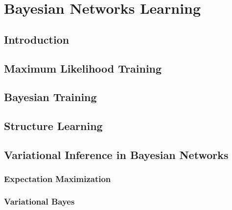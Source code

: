\documentclass[twoside,openright,titlepage,numbers=noenddot,openany,headinclude,footinclude=true, cleardoublepage=empty,abstractoff,BCOR=5mm,paper=a4,fontsize=11pt, dvipsnames]{scrreprt}
\begin{document}



\ctparttext{
  \color{black}
  \begin{center}

  \end{center}
}
\part{Bayesian Networks Learning}

\chapter{Introduction}



\chapter{Maximum Likelihood Training}



\chapter{Bayesian Training}



\chapter{Structure Learning}



\chapter{Variational Inference in Bayesian Networks}



\section{Expectation Maximization}\label{sec:em}



\section{Variational Bayes}
\end{document}
